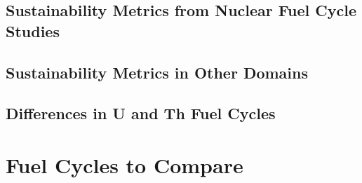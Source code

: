 \documentclass{article}
\begin{document}
\subsection{Sustainability Metrics from Nuclear Fuel Cycle Studies}

\subsection{Sustainability Metrics in Other Domains}

\subsection{Differences in U and Th Fuel Cycles}



%

\section{Fuel Cycles to Compare}



\end{document}
